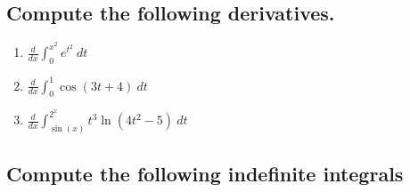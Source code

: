 \documentclass{article}
\begin{document}
\subsection{Compute the following derivatives.}

\begin{multicols}{3}
\begin{enumerate}
\item $\displaystyle \frac{d}{dx}\int_0^{x^2}e^{t^2}\ dt$
\item $\displaystyle \frac{d}{dx}\int_0^{1}\cos(3t+4)\ dt$
\item $\displaystyle \frac{d}{dx}\int_{\sin(x)}^{2^x}t^3\ln(4t^2-5)\ dt$
\end{enumerate}
\end{multicols}


\subsection{Compute the following indefinite integrals}
\end{document}
